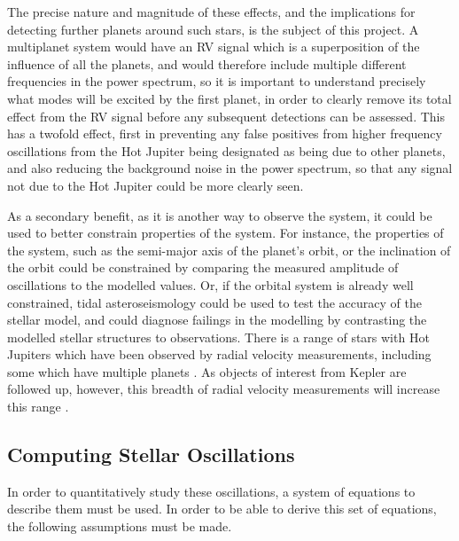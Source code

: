 \documentclass[11pt]{amsart}
\begin{document}
The precise nature and magnitude of these effects, and the implications for detecting further planets around such stars, is the subject of this project.  A multiplanet system would have an RV signal which is a superposition of the influence of all the planets, and would therefore include multiple different frequencies in the power spectrum, so it is important to understand precisely what modes will be excited by the first planet, in order to clearly remove its total effect from the RV signal before any subsequent detections can be assessed.  This has a twofold effect, first in preventing any false positives from higher frequency oscillations from the Hot Jupiter being designated as being due to other planets, and also reducing the background noise in the power spectrum, so that any signal not due to the Hot Jupiter could be more clearly seen.

As a secondary benefit, as it is another way to observe the system, it could be used to better constrain properties of the system.  For instance, the properties of the system, such as the semi-major axis of the planet's orbit, or the inclination of the orbit could be constrained by comparing the measured amplitude of oscillations to the modelled values.  Or, if the orbital system is already well constrained, tidal asteroseismology could be used to test the accuracy of the stellar model, and could diagnose failings in the modelling by contrasting the modelled stellar structures to observations.  There is a range of stars with Hot Jupiters which have been observed by radial velocity measurements, including some which have multiple planets \cite{NASAExoplanet}.  As objects of interest from Kepler are followed up, however, this  breadth of radial velocity measurements will increase this range \cite{Crouzet2017}.




\subsection{Computing Stellar Oscillations} \label{Intro:StellarOsc}

In order to quantitatively study these oscillations, a system of equations to describe them must be used.  In order to be able to derive this set of equations, the following assumptions must be made.
\end{document}
